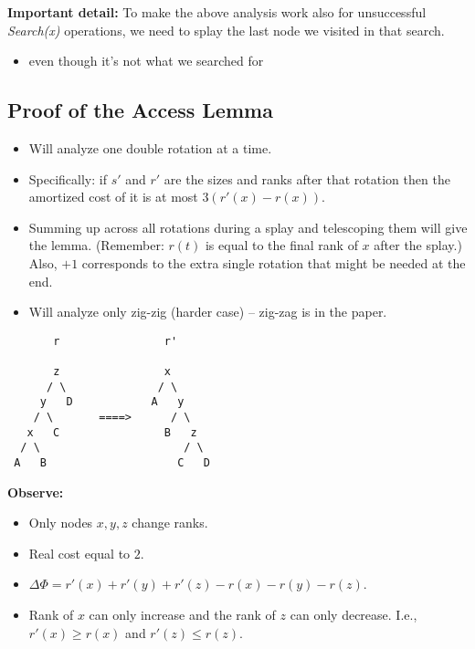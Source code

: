 \documentclass{article}
\begin{document}
{\bf Important detail:} To make the above analysis work also for unsuccessful {\em Search(x)} operations, we need to splay the last node we visited in that search.
\begin{itemize}
  \item even though it's not what we searched for
\end{itemize}

\subsection{Proof of the Access Lemma}
\begin{itemize}
\item Will analyze one double rotation at a time. 
\item Specifically: if $s'$ and $r'$ are the sizes and ranks after that rotation then the amortized cost of it is at most $3(r'(x)-r(x))$. 
\item Summing up across all rotations during a splay and telescoping them will give the lemma. (Remember: $r(t)$ is equal to the final rank of $x$ after the splay.) Also, $+1$ corresponds to the extra single rotation that might be needed at the end.
\item {Will analyze only zig-zig (harder case) -- zig-zag is in the paper.}
\end{itemize}




\begin{verbatim}
       r                r' 

       z                x
      / \              / \
     y   D            A   y
    / \       ====>      / \
   x   C                B   z
  / \                      / \   
 A   B                    C   D

\end{verbatim}

{\bf Observe:}
\begin{itemize}
\item Only nodes $x,y,z$ change ranks.
\item Real cost equal to $2$.
\item $\Delta \Phi = r'(x)+r'(y)+r'(z)-r(x)-r(y)-r(z)$.
\item Rank of $x$ can only increase and the rank of $z$ can only decrease. I.e., $r'(x)\geq r(x)$ and $r'(z)\leq r(z)$. 
\end{itemize}
\end{document}
